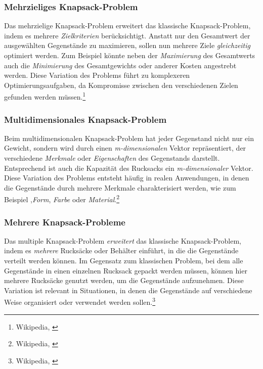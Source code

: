 \subsubsection*{Mehrzieliges Knapsack-Problem}
Das mehrzielige Knapsack-Problem erweitert das klassische Knapsack-Problem, indem es mehrere \textit{Zielkriterien}
berücksichtigt. Anstatt nur den Gesamtwert der ausgewählten Gegenstände zu maximieren, sollen nun mehrere Ziele
\textit{gleichzeitig} optimiert werden. Zum Beispiel könnte neben der \textit{Maximierung} des Gesamtwerts auch die
\textit{Minimierung} des Gesamtgewichts oder anderer Kosten angestrebt werden. Diese Variation des Problems führt zu
komplexeren Optimierungsaufgaben, da Kompromisse zwischen den verschiedenen Zielen gefunden werden müssen.\footnote{Wikipedia, \cite{Multi-objective Knapsack-Problem}}

\subsubsection*{Multidimensionales Knapsack-Problem}
Beim multidimensionalen Knapsack-Problem hat jeder Gegenstand nicht nur ein Gewicht, sondern wird durch einen
\textit{m-dimensionalen} Vektor repräsentiert, der verschiedene \textit{Merkmale} oder \textit{Eigenschaften} des Gegenstands
darstellt. Entsprechend ist auch die Kapazität des Rucksacks ein \textit{m-dimensionaler} Vektor. Diese Variation des
Problems entsteht häufig in realen Anwendungen, in denen die Gegenstände durch mehrere Merkmale charakterisiert werden,
wie zum Beispiel ,\textit{Form}, \textit{Farbe} oder \textit{Material}.\footnote{Wikipedia, \cite{Multi-dimensional Knapsack-Problem}}

\subsubsection*{Mehrere Knapsack-Probleme}
Das multiple Knapsack-Problem \textit{erweitert} das klassische Knapsack-Problem, indem es \textit{mehrere} Rucksäcke
oder Behälter einführt, in die die Gegenstände verteilt werden können. Im Gegensatz zum klassischen Problem, bei dem
alle Gegenstände in einen einzelnen Rucksack gepackt werden müssen, können hier mehrere Rucksäcke genutzt werden, um die
Gegenstände aufzunehmen. Diese Variation ist relevant in Situationen, in denen die Gegenstände auf verschiedene Weise
organisiert oder verwendet werden sollen.\footnote{Wikipedia, \cite{Multi Knapsack-Problem}}

